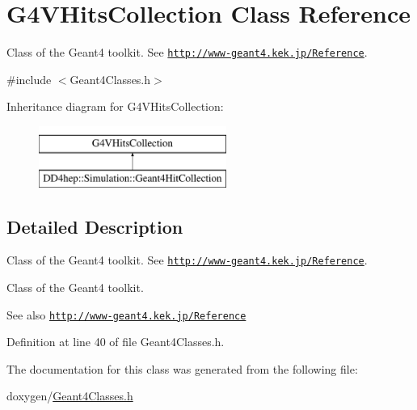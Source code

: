 \hypertarget{class_g4_v_hits_collection}{}\section{G4\+V\+Hits\+Collection Class Reference}
\label{class_g4_v_hits_collection}


Class of the Geant4 toolkit. See \href{http://www-geant4.kek.jp/Reference}{\tt http\+://www-\/geant4.\+kek.\+jp/\+Reference}.  




{\ttfamily \#include $<$Geant4\+Classes.\+h$>$}

Inheritance diagram for G4\+V\+Hits\+Collection\+:\begin{figure}[H]
\begin{center}
\leavevmode
\includegraphics[height=2.000000cm]{class_g4_v_hits_collection}
\end{center}
\end{figure}


\subsection{Detailed Description}
Class of the Geant4 toolkit. See \href{http://www-geant4.kek.jp/Reference}{\tt http\+://www-\/geant4.\+kek.\+jp/\+Reference}. 

Class of the Geant4 toolkit. \begin{DoxySeeAlso}{See also}
\href{http://www-geant4.kek.jp/Reference}{\tt http\+://www-\/geant4.\+kek.\+jp/\+Reference} 
\end{DoxySeeAlso}


Definition at line 40 of file Geant4\+Classes.\+h.



The documentation for this class was generated from the following file\+:\begin{DoxyCompactItemize}
\item 
doxygen/\hyperlink{_geant4_classes_8h}{Geant4\+Classes.\+h}\end{DoxyCompactItemize}
